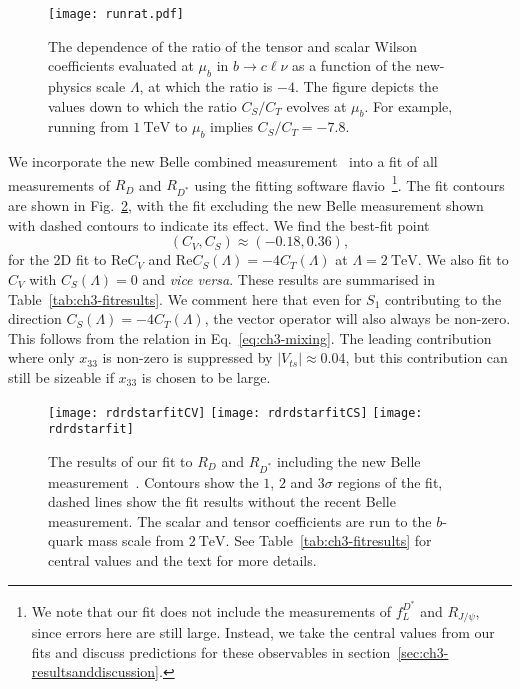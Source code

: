 \begin{figure}[t]
  \centering%
\centering \texttt{[image: runrat.pdf]}
\caption[The dependence of the ratio of the tensor and scalar Wilson
coefficients evaluated at $\mu_b$ in $b \to c \ell \nu$ as a function of the
new-physics scale $\Lambda$, at which the ratio is $-4$.]{The dependence of the
  ratio of the tensor and scalar Wilson coefficients evaluated at $\mu_b$ in
  $b \to c \ell \nu$ as a function of the new-physics scale $\Lambda$, at which
  the ratio is $-4$. The figure depicts the values down to which the ratio
  $C_S/C_T$ evolves at $\mu_b$. For example, running from $\SI{1}{\TeV}$ to
  $\mu_b$ implies $C_S/C_T= -7.8$.}
\label{fig:ch3-runrat}
\end{figure}

We incorporate the new Belle combined measurement~\cite{Abdesselam:2019dgh} into
a fit of all measurements of $R_{D}$ and $R_{D^*}$ using the fitting software
\textsf{flavio}~\cite{Straub:2018kue}\footnote{We note that our fit does not
  include the measurements of $f_L^{D^*}$ and $R_{J/\psi}$, since errors here
  are still large. Instead, we take the central values from our fits and discuss
  predictions for these observables in
  section~\ref{sec:ch3-resultsanddiscussion}.}. The fit contours are shown in
Fig.~\ref{fig:ch3-fit}, with the fit excluding the new Belle measurement shown
with dashed contours to indicate its effect. We find the best-fit point
\begin{equation}
({C}_{V}, {C}_{S}) \approx (-0.18, 0.36),
\end{equation}
for the 2D fit to $\text{Re} C_{V}$ and
$\text{Re} C_{S} (\Lambda) = -4 C_T(\Lambda)$ at $\Lambda = \SI{2}{\TeV}$. We
also fit to $C_{V}$ with $C_{S}(\Lambda)=0$ and \textit{vice versa}. These
results are summarised in Table~\ref{tab:ch3-fitresults}. We comment here that
even for $S_{1}$ contributing to the direction
$C_{S}(\Lambda) = - 4 C_T(\Lambda)$, the vector operator will also always be
non-zero. This follows from the relation in Eq.~\eqref{eq:ch3-mixing}. The
leading contribution where only $x_{33}$ is non-zero is suppressed by
$|V_{ts}| \approx 0.04$, but this contribution can still be sizeable if $x_{33}$
is chosen to be large.

\begin{figure}
    \centering
    \texttt{[image: rdrdstarfitCV]}
    \texttt{[image: rdrdstarfitCS]}
    \texttt{[image: rdrdstarfit]}
    \caption[The results of our fit to $R_D$ and $R_{D^*}$ including the new
    Belle measurement~\cite{Abdesselam:2019dgh}.]{The results of our fit to
      $R_D$ and $R_{D^*}$ including the new Belle
      measurement~\cite{Abdesselam:2019dgh}. Contours show the $1$, $2$ and
      $3\sigma$ regions of the fit, dashed lines show the fit results without
      the recent Belle measurement. The scalar and tensor coefficients are run
      to the $b$-quark mass scale from $\SI{2}{\TeV}$. See
      Table~\ref{tab:ch3-fitresults} for central values and the text for more
      details.}
    \label{fig:ch3-fit}
\end{figure}

